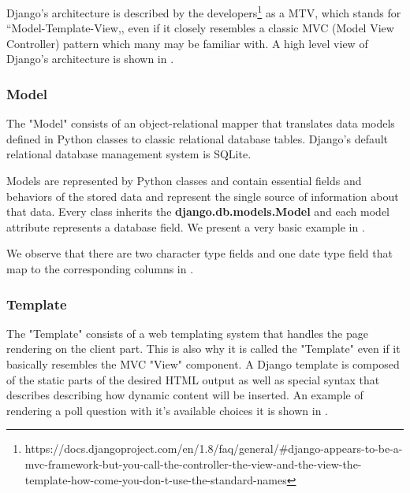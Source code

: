Django's architecture is described by the developers\footnote{https://docs.djangoproject.com/en/1.8/faq/general/\#django-appears-to-be-a-mvc-framework-but-you-call-the-controller-the-view-and-the-view-the-template-how-come-you-don-t-use-the-standard-names\label{note1}} as a MTV, which stands for ``Model-Template-View,, even if it closely resembles a classic MVC (Model View Controller) pattern which many may be familiar with. A high level view of Django's architecture is shown in .


\subsubsection{Model}
\label{sub-sub-sec:model}

The "Model" consists of an object-relational mapper that translates data models defined in Python classes to classic relational database tables. Django's default relational database management system is SQLite.

Models are represented by Python classes and contain essential fields and behaviors of the stored data and represent the single source of information about that data. Every class inherits the \textbf{django.db.models.Model} and each model attribute represents a database field. We present a  very basic example in .



We observe that there are two character type fields and one date type field that map to the corresponding columns in .



\subsubsection{Template}
\label{sub-sub-sec:template}

The "Template" consists of a web templating system that handles the page rendering on the client part. This is also why it is called the "Template" even if it basically resembles the MVC "View" component. A Django template is composed of the static parts of the desired HTML output as well as special syntax that describes describing how dynamic content will be inserted. An example of rendering a poll question with it's available choices it is shown in .

